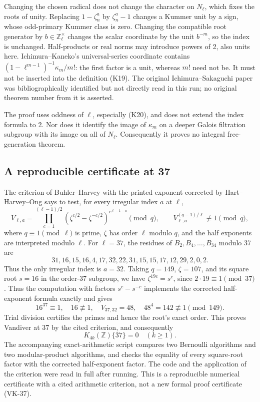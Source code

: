 Changing the chosen radical does not change the character
on \(N_\ell\), which fixes the roots of unity.
Replacing \(1-\zeta_n^a\) by \(\zeta_n^a-1\) changes a
Kummer unit by a sign, whose odd-primary Kummer class is
zero. Changing the compatible root generator by
\(b\in\mathbb Z_\ell^\times\) changes the scalar coordinate
by the unit \(b^{-m}\), so the index is unchanged.
Half-products or real norms may introduce powers of 2,
also units here. Ichimura--Kaneko's universal-series
coordinate \cite[\S1.1, pp.~313--314]{IchimuraKaneko1989}
contains \((1-\ell^{m-1})^{-1}\kappa_m/m!\):
the first factor is a unit, whereas \(m!\) need not be.
It must not be inserted into the definition (K19).
The original Ichimura--Sakaguchi paper was bibliographically
identified but not directly read in this run; no original
theorem number from it is asserted.

The proof uses oddness of \(\ell\), especially (K20), and
does not extend the index formula to 2. Nor does it
identify the image of \(\kappa_m\) on a deeper Galois
filtration subgroup with its image on all of \(N_\ell\).
Consequently it proves no integral free-generation theorem.

\subsection{A reproducible certificate at 37}

The criterion of Buhler--Harvey
\cite[\S4, author preprint pp.~4--5]{BuhlerHarvey2011}
with the printed exponent corrected by Hart--Harvey--Ong
\cite[\S7, author preprint p.~13]{HartHarveyOng2017}
says to test, for every irregular index \(a\) at \(\ell\),
\[
 V_{\ell,a}=
 \prod_{c=1}^{(\ell-1)/2}
   (\zeta^{c/2}-\zeta^{-c/2})^{c^{\ell-1-a}}\pmod q,\qquad
 V_{\ell,a}^{(q-1)/\ell}\not\equiv1\pmod q,           \tag{K21}
\]
where \(q\equiv1\pmod\ell\) is prime, \(\zeta\) has order
\(\ell\) modulo \(q\), and the half exponents are interpreted
modulo \(\ell\).
For \(\ell=37\), the residues of
\(B_2,B_4,\ldots,B_{34}\) modulo 37 are
\[
31,16,15,16,4,17,32,22,31,15,15,17,12,29,2,0,2.
\]
Thus the only irregular index is \(a=32\).
Taking \(q=149\), \(\zeta=107\), and its square root
\(s=16\) in the order-37 subgroup, we have
\(\zeta^{19c}=s^c\), since \(2\cdot19\equiv1\pmod{37}\).
Thus the computation with factors \(s^c-s^{-c}\) implements
the corrected half-exponent formula exactly and gives
\[
 16^{37}\equiv1,\quad16\not\equiv1,\quad
 V_{37,32}=48,\quad48^4=142\not\equiv1\pmod{149}.
\]
Trial division certifies the primes and hence the root's
exact order. This proves Vandiver at 37 by the cited
criterion, and consequently
\[
 K_{4k}(\mathbb Z)\{37\}=0\quad(k\ge1).
\]
The accompanying exact-arithmetic script compares two
Bernoulli algorithms and two modular-product algorithms,
and checks the equality of every square-root factor with
the corrected half-exponent factor.
The code and the application of the criterion were read
in full after running. This is a reproducible numerical
certificate with a cited arithmetic criterion, not a new
formal proof certificate (VK-37).

